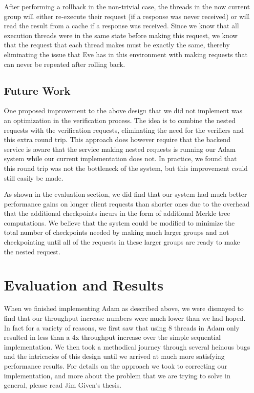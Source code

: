 \documentclass[11pt, oneside]{report}
\begin{document}
After performing a rollback in the non-trivial case, the threads in the now current group will either re-execute their request (if a response was never received) or will read the result from a cache if a response was received. Since we know that all execution threads were in the same state before making this request, we know that the request that each thread makes must be exactly the same, thereby eliminating the issue that Eve has in this environment with making requests that can never be repeated after rolling back.

\section{Future Work}

One proposed improvement to the above design that we did not implement was an optimization in the verification process. The idea is to combine the nested requests with the verification requests, eliminating the need for the verifiers and this extra round trip. This approach does however require that the backend service is aware that the service making nested requests is running our Adam system while our current implementation does not. In practice, we found that this round trip was not the bottleneck of the system, but this improvement could still easily be made.

As shown in the evaluation section, we did find that our system had much better performance gains on longer client requests than shorter ones due to the overhead that the additional checkpoints incurs in the form of additional Merkle tree computations. We believe that the system could be modified to minimize the total number of checkpoints needed by making much larger groups and not checkpointing until all of the requests in these larger groups are ready to make the nested request.

\chapter{Evaluation and Results}\label{AdamResults}

When we finished implementing Adam as described above, we were dismayed to find that our throughput increase numbers were much lower than we had hoped. In fact for a variety of reasons, we first saw that using 8 threads in Adam only resulted in less than a 4x throughput increase over the simple sequential implementation. We then took a methodical journey through several heinous bugs and the intricacies of this design until we arrived at much more satisfying performance results. For details on the approach we took to correcting our implementation, and more about the problem that we are trying to solve in general, please read Jim Given's thesis.
\end{document}

